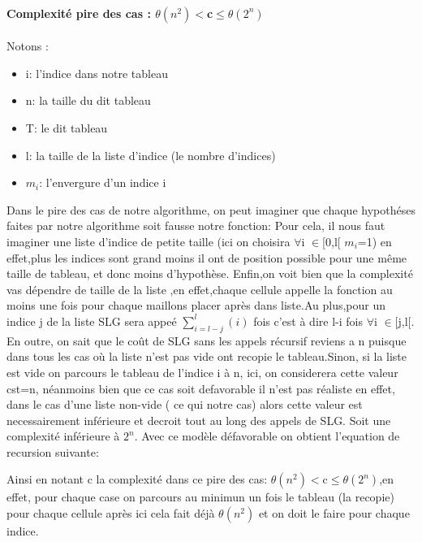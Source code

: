 \documentclass{article}
\begin{document}
\paragraph{Complexit\'e pire des cas : $\theta(n^2) <$c$\leq\theta(2^n)$\\ }
 Notons :
\begin{itemize}
\item i: l'indice dans notre tableau
\item n: la taille du dit tableau
\item T: le dit tableau
\item l: la taille de la liste d'indice (le nombre d'indices)
\item $m_i$: l'envergure d'un indice i
\end{itemize}
Dans le pire des cas de notre algorithme, on peut imaginer que chaque hypoth\'eses faites par notre algorithme soit fausse notre fonction: Pour cela, il nous faut imaginer une liste d'indice de petite taille (ici on choisira $\forall$i $\in$[0,l[ $m_i$=1) en effet,plus les indices sont grand moins il ont de position possible pour une m\^eme taille de tableau, et donc moins d'hypoth\`ese.
\newline Enfin,on voit bien que la complexit\'e vas d\'ependre de taille de la liste ,en effet,chaque cellule appelle la fonction au moins une fois pour chaque maillons placer apr\`es dans liste.Au plus,pour un indice j de la liste SLG sera appe\'e $\sum_{i=l-j}^{l} (i)$ fois c'est \`a dire l-i fois $\forall$i $\in$[j,l[.
\newline En outre, on sait que le co\^ut de SLG sans les appels r\'ecursif reviens a n puisque dans tous les cas o\`u la liste n'est pas vide ont recopie le tableau.Sinon, si la liste est vide on parcours le tableau de l'indice i \`a n, ici, on considerera cette valeur cst=n, n\'eanmoins bien que ce cas soit defavorable il n'est pas r\'ealiste en effet, dans le cas d'une liste non-vide ( ce qui notre cas) alors cette valeur est necessairement inf\'erieure et decroit tout au long des appels de SLG.
Soit une complexit\'e inf\'erieure \`a $2^n$.
\newline
Avec ce mod\`ele d\'efavorable on obtient l'equation de recursion suivante:
\begin{center}
\end{center}
Ainsi en notant c la complexit\'e dans ce pire des cas: $\theta(n^2) <$c$\leq\theta(2^n)$,en effet, pour chaque case on parcours au minimun un fois le tableau (la recopie) pour chaque cellule apr\`es ici cela fait d\'ej\`a $\theta(n^2)$ et on doit le faire pour chaque indice.
\end{document}
